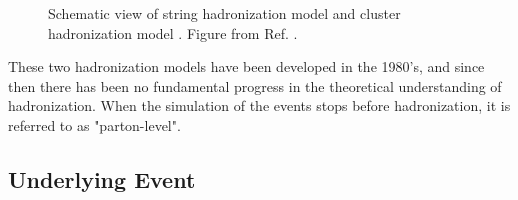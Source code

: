 \begin{figure}[h]
\begin{center}
\end{center}
 \caption{Schematic view of string hadronization model  and cluster hadronization model . Figure from Ref. \cite{Isildak:2013kfa}.}
  \label{fig:had_model}
\end{figure}


These two hadronization models have been developed in the 1980's, and since then there has been no fundamental progress in the theoretical understanding of hadronization. 
When the simulation of the events stops before hadronization, it is referred to as "parton-level".

\subsection{Underlying Event}


